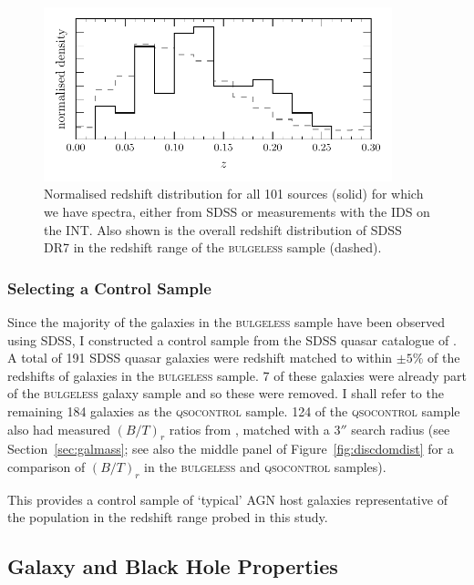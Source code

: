 \begin{figure}
\centering
\includegraphics[width=0.9\textwidth]{agn/z_distribution_101_sdss.pdf}
\caption[Redshift distribution of the \textsc{bulgeless} sample]{Normalised redshift distribution for all 101 sources (solid) for which we have spectra, either from SDSS or measurements with the IDS on the INT. Also shown is the overall redshift distribution of SDSS DR7 in the redshift range of the \textsc{bulgeless} sample (dashed).
}
\label{fig:redshifts}
\end{figure}

\subsubsection{Selecting a Control Sample}

Since the majority of the galaxies in the \textsc{bulgeless} sample have been observed using SDSS, I constructed a control sample from the SDSS quasar catalogue of \citet{shen11}. A total of 191 SDSS quasar galaxies were redshift matched to within $\pm5\%$ of the redshifts of galaxies in the \textsc{bulgeless} sample. 7 of these galaxies were already part of the \textsc{bulgeless} galaxy sample and so these were removed.  I shall refer to the remaining 184 galaxies as the \textsc{qsocontrol} sample. 124 of the \textsc{qsocontrol} sample also had measured $(B/T)_r$ ratios from \citet[][]{simard11}, matched with a $3''$ search radius (see Section~\ref{sec:galmass}; see also the middle panel of Figure~\ref{fig:discdomdist} for a comparison of $(B/T)_r$ in the \textsc{bulgeless} and \textsc{qsocontrol} samples). 

This provides a control sample of `typical' AGN host galaxies representative of the population in the redshift range probed in this study. 

%
%
\subsection{Galaxy and Black Hole Properties}\label{sec:masses}
%
%

